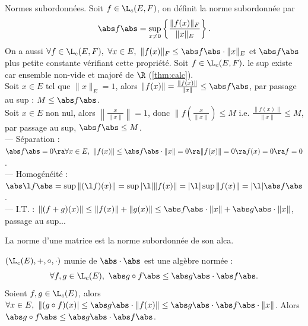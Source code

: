 \documentclass[11pt]{article}
\begin{document}
\begin{defi}{Normes subordonnées.}{}
    Soit $f\in\L_c(E,F)$, on définit la norme subordonnée par
    \begin{equation*}
        \abs f \abs = \sup_{x\neq0}\left\{\frac{\|f(x)\|_F}{\|x\|_E}\right\}.
    \end{equation*}
    On a aussi $\forall f \in \L_c(E,F), ~ \forall x \in E, ~ \|f(x)\|_F \leq \abs f \abs \cdot \|x\|_E$ et $\abs f \abs$ plus petite constante vérifiant cette propriété.
    \tcblower
    Soit $f\in\L_c(E,F)$. le sup existe car ensemble non-vide et majoré de $\R$ (\ref{thm:calc}).\\
    Soit $x\in E$ tel que $\|x\|_E=1$, alors $\|f(x)\|=\frac{\|f(x)\|}{\|x\|}\leq\abs f \abs$, par passage au sup : $M\leq \abs f \abs$.\\
    Soit $x\in E$ non nul, alors $\left\|\frac{x}{\|x\|}\right\|=1$, donc $\|f\left( \frac{x}{\|x\|}  \right) \leq M$ i.e. $\frac{\|f(x)\|}{\|x\|}\leq M$, par passage au sup, $\abs f \abs \leq M$.\\
    --- Séparation : $\abs f \abs = 0 \ra \forall x \in E, ~ \| f(x) \| \leq \abs f \abs\cdot\|x\|=0 \ra \|f(x)\|=0 \ra f(x)=0\ra f=0$.\\
    --- Homogénéité : $\abs \l f \abs = \sup \|(\l f)(x)\| = \sup |\l|\|f(x)\| = |\l| \sup \|f(x)\| = |\l| \abs f \abs$.\\
    --- I.T. : $\|(f+g)(x)\|\leq\|f(x)\|+\|g(x)\|\leq \abs f \abs\cdot\|x\| + \abs g \abs\cdot\|x\|$, passage au sup...
\end{defi}

\vspace*{-0.8cm}

\begin{defi}{}{}
    La norme  d'une matrice est la norme subordonnée de son alca.
\end{defi}

\vspace*{-0.8cm}

\begin{prop}{}{}
    $(\L_c(E),+,\circ,\cdot)$ munie de $\abs\cdot\abs$ est une algèbre normée :
    \begin{equation*}
        \forall f, g \in \L_c(E), ~ \abs g \circ f \abs \leq \abs g \abs \cdot \abs f \abs.
    \end{equation*}
    \tcblower
    Soient $f,g\in\L_c(E)$, alors $\forall x \in E, ~ \|(g\circ f)(x)|\leq \abs g \abs \cdot \|f(x)\| \leq \abs g \abs \cdot \abs f \abs \cdot \|x\|$. Alors $\abs g\circ f \abs \leq \abs g \abs \cdot \abs f \abs$.
\end{prop}
\end{document}
